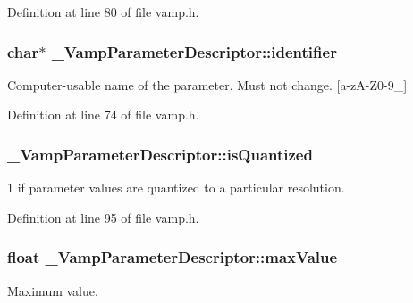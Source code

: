 Definition at line 80 of file vamp.\+h.

\subsubsection[{\texorpdfstring{identifier}{identifier}}]{ char$\ast$ \+\_\+\+Vamp\+Parameter\+Descriptor\+::identifier}\hypertarget{struct___vamp_parameter_descriptor_a26d74afd6a3341a673f15955031845ab}{}\label{struct___vamp_parameter_descriptor_a26d74afd6a3341a673f15955031845ab}
Computer-\/usable name of the parameter. Must not change. \mbox{[}a-\/z\+A-\/\+Z0-\/9\+\_\+\mbox{]} 

Definition at line 74 of file vamp.\+h.

\subsubsection[{\texorpdfstring{is\+Quantized}{isQuantized}}]{ \+\_\+\+Vamp\+Parameter\+Descriptor\+::is\+Quantized}\hypertarget{struct___vamp_parameter_descriptor_a3f41e3b6b69c7a95ff0ce8625794f83a}{}\label{struct___vamp_parameter_descriptor_a3f41e3b6b69c7a95ff0ce8625794f83a}
1 if parameter values are quantized to a particular resolution. 

Definition at line 95 of file vamp.\+h.

\subsubsection[{\texorpdfstring{max\+Value}{maxValue}}]{\setlength{\rightskip}{0pt plus 5cm}float \+\_\+\+Vamp\+Parameter\+Descriptor\+::max\+Value}\hypertarget{struct___vamp_parameter_descriptor_a6e7646babdb265c4abfc107ba4350d80}{}\label{struct___vamp_parameter_descriptor_a6e7646babdb265c4abfc107ba4350d80}
Maximum value. 

